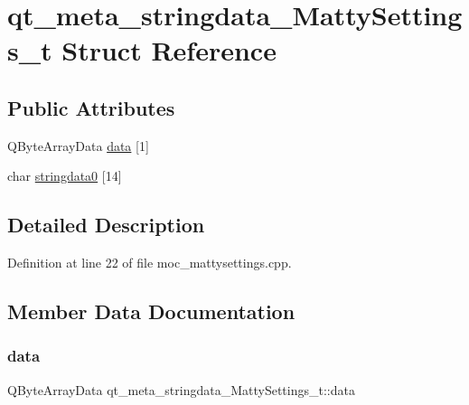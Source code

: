 \hypertarget{structqt__meta__stringdata__MattySettings__t}{}\section{qt\+\_\+meta\+\_\+stringdata\+\_\+\+Matty\+Settings\+\_\+t Struct Reference}
\label{structqt__meta__stringdata__MattySettings__t}
\subsection*{Public Attributes}
\begin{DoxyCompactItemize}
\item 
Q\+Byte\+Array\+Data \hyperlink{structqt__meta__stringdata__MattySettings__t_aecbfa5782c64051df47fbe5036e76fa8}{data} \mbox{[}1\mbox{]}
\item 
char \hyperlink{structqt__meta__stringdata__MattySettings__t_a266b7703ec9f21f50b222ad586c210e3}{stringdata0} \mbox{[}14\mbox{]}
\end{DoxyCompactItemize}


\subsection{Detailed Description}


Definition at line 22 of file moc\+\_\+mattysettings.\+cpp.



\subsection{Member Data Documentation}
\hypertarget{structqt__meta__stringdata__MattySettings__t_aecbfa5782c64051df47fbe5036e76fa8}{}\label{structqt__meta__stringdata__MattySettings__t_aecbfa5782c64051df47fbe5036e76fa8} 
\subsubsection{\texorpdfstring{data}{data}}
{\footnotesize\ttfamily Q\+Byte\+Array\+Data qt\+\_\+meta\+\_\+stringdata\+\_\+\+Matty\+Settings\+\_\+t\+::data}




